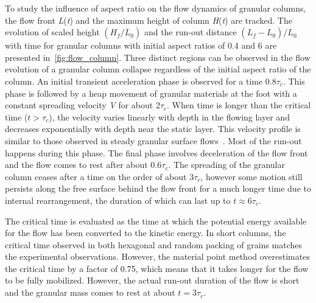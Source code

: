 To study the influence of aspect ratio on the flow dynamics of granular 
columns, the flow front \textit{L}(\textit{t}) and the maximum height of column 
\textit{H}(\textit{t}) are tracked. The evolution of scaled height 
$(H_{\textit{f}}/L_{\textit{0}})$ and the run-out distance 
$(L_{\textit{f}}-L_{\textit{0}})/L_{\textit{0}}$ with time for granular columns 
with initial aspect ratios of 0.4 and 6 are presented 
in~\cref{fig:flow_column}. Three distinct regions can be observed in the flow 
evolution of a granular column collapse regardless of the initial aspect ratio 
of the column. An initial transient acceleration phase is observed for a time 
0.8$\tau_{c}$. 
This phase is followed by a heap movement of granular materials at the foot 
with a constant spreading velocity \textit{V} for about 2$\tau_{c}$. When time 
is longer than the critical time ($t > \tau_{c}$), the velocity varies linearly 
with depth in the flowing layer and decreases exponentially with depth near the 
static layer. 
This velocity profile is similar to those observed in steady granular surface 
flows~\citep{Lajeunesse2004}. Most of the run-out happens during this phase. 
The final phase involves deceleration of the flow front and the flow comes to 
rest after about 0.6$\tau_{c}$. The spreading of the granular column ceases 
after a time on the order of about 3$\tau_{c}$, however some motion still 
persists along the free surface behind the flow front for a much longer time 
due to internal rearrangement, the duration of which can last up to $\textit{t} 
\approx 6\tau_{c}$. 

The critical time is evaluated as the time at which the potential energy 
available for the flow has been converted to the kinetic energy. In short 
columns, the critical time observed in both hexagonal and random packing of 
grains matches the experimental observations. However, the material point 
method overestimates the critical time by a factor of 0.75, which means that it 
takes longer for the flow to be fully mobilized. However, the actual run-out 
duration of the flow is short and the granular mass comes to rest at about 
$\textit{t}=3\tau_{c}$.
 
